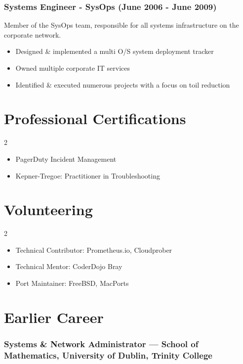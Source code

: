 \documentclass[a4paper, 10pt] {article}
\begin{document}
\subsubsection*{Systems Engineer - SysOps (June 2006 - June 2009)}

Member of the SysOps team, responsible for all systems infrastructure on
the corporate network.

\begin{itemize}[noitemsep]
	\item Designed \& implemented a multi O/S system deployment tracker
	\item Owned multiple corporate IT services
	\item Identified \& executed numerous projects with a focus on toil reduction
\end{itemize}

\section*{Professional Certifications}

\begin{multicols}{2}
\begin{itemize}[noitemsep]
  \item PagerDuty Incident Management
  \item Kepner-Tregoe: Practitioner in Troubleshooting
\end{itemize}
\end{multicols}

\section*{Volunteering}

\begin{multicols}{2}
\begin{itemize}[noitemsep]
  \item Technical Contributor: Prometheus.io, Cloudprober
  \item Technical Mentor: CoderDojo Bray
  \item Port Maintainer: FreeBSD, MacPorts
\end{itemize}
\end{multicols}

\section*{Earlier Career}

\subsubsection*{Systems \& Network Administrator --- School of Mathematics, University of Dublin, Trinity College}
\end{document}
